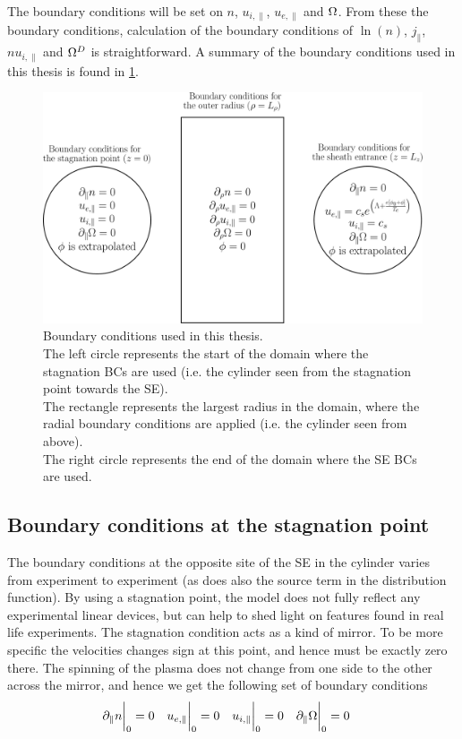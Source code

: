 The boundary conditions will be set on $n$, $u_{i,\|}$, $u_{e,\|}$ and $\Omega$.
From these the boundary conditions, calculation of the boundary conditions of $\ln(n)$, $j_\|$, $nu_{i,\|}$ and $\Omega^D$ is straightforward.
A summary of the boundary conditions used in this thesis is found in \cref{fig:BCs}.
%
\begin{figure}[htb]
    \centering
    \includegraphics[width=1.0\textwidth]{fig/BCs}
    \caption{
        Boundary conditions used in this thesis.\\
        The left circle represents the start of the domain where the stagnation BCs are used (i.e. the cylinder seen from the stagnation point towards the SE).\\
        The rectangle represents the largest radius in the domain, where the radial boundary conditions are applied (i.e. the cylinder seen from above).\\
        The right circle represents the end of the domain where the SE BCs are used.\\
    }
    \label{fig:BCs}
\end{figure}

\subsection{Boundary conditions at the stagnation point}
The boundary conditions at the opposite site of the SE in the cylinder varies from experiment to experiment (as does also the source term in the distribution function).
By using a stagnation point, the model does not fully reflect any experimental linear devices, but can help to shed light on features found in real life experiments.
The stagnation condition acts as a kind of mirror.
To be more specific the velocities changes sign at this point, and hence must be exactly zero there.
The spinning of the plasma does not change from one side to the other across the mirror, and hence we get the following set of boundary conditions
%
\begin{align*}
    &\partial_\| n \bigg|_0    =0 &
    &u_{e,\|} \bigg|_0         =0 &
    &u_{i,\|} \bigg|_0         =0 &
    &\partial_\|\Omega \bigg|_0   =0 &
\end{align*}

